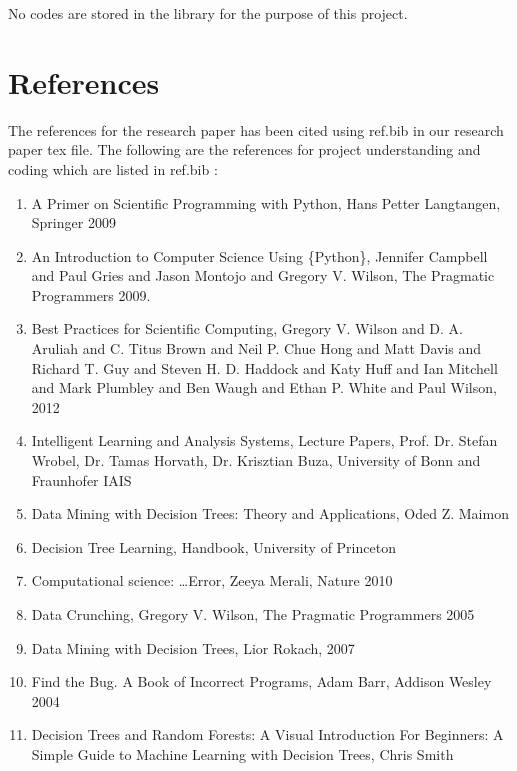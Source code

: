 \documentclass[a4paper,11pt,english]{sphinxmanual}
\begin{document}
No codes are stored in the library for the purpose of this project.


\chapter{References}
\label{\detokenize{references:references}}\label{\detokenize{references:id1}}\label{\detokenize{references::doc}}


The references for the research paper has been cited using ref.bib in our research paper tex file. The following are the references for project understanding and coding which are listed in ref.bib :
\begin{enumerate}
\def\theenumi{\arabic{enumi}}
\def\labelenumi{\theenumi .}
\makeatletter\def\p@enumii{\p@enumi \theenumi .}\makeatother
\item {} 
A Primer on Scientific Programming with Python, Hans Petter Langtangen, Springer 2009

\item {} 
An Introduction to Computer Science Using \{Python\}, Jennifer Campbell and Paul Gries and Jason Montojo and Gregory V. Wilson, The Pragmatic Programmers 2009.

\item {} 
Best Practices for Scientific Computing, Gregory V. Wilson and D. A. Aruliah and C. Titus Brown and Neil P. Chue Hong and Matt Davis and Richard T. Guy and Steven H. D. Haddock and Katy Huff and Ian Mitchell and Mark Plumbley and Ben Waugh and Ethan P. White and Paul Wilson, 2012

\item {} 
Intelligent Learning and Analysis Systems, Lecture Papers, Prof. Dr. Stefan Wrobel, Dr. Tamas Horvath, Dr. Krisztian Buza, University of Bonn and Fraunhofer IAIS

\item {} 
Data Mining with Decision Trees: Theory and Applications, Oded Z. Maimon

\item {} 
Decision Tree Learning, Handbook, University of Princeton

\item {} 
Computational science: …Error, Zeeya Merali, Nature 2010

\item {} 
Data Crunching, Gregory V. Wilson, The Pragmatic Programmers 2005

\item {} 
Data Mining with Decision Trees, Lior Rokach, 2007

\item {} 
Find the Bug. A Book of Incorrect Programs, Adam Barr, Addison Wesley 2004

\item {} 
Decision Trees and Random Forests: A Visual Introduction For Beginners: A Simple Guide to Machine Learning with Decision Trees, Chris Smith

\end{enumerate}
\end{document}
